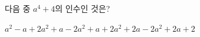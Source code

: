 다음 중 $a^4+4$의 인수인 것은?
\begin{choices32}{$a^2-a+2$}{$a^2+a-2$}{$a^2+a+2$}{$a^2+2a-2$}{$a^2+2a+2$}\end{choices32}
